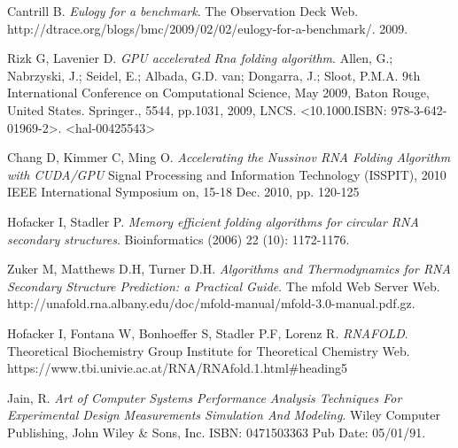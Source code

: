 \documentclass[12pt]{article}
\begin{document}
\begin{thebibliography}{56}
Cantrill B.
\textit{Eulogy for a benchmark}.
The Observation Deck Web. http://dtrace.org/blogs/bmc/2009/02/02/eulogy-for-a-benchmark/.
2009.

Rizk G, Lavenier D.
\textit{GPU accelerated Rna folding algorithm}.
Allen, G.; Nabrzyski, J.; Seidel, E.; Albada, G.D. van; Dongarra, J.; Sloot, P.M.A. 9th International Conference on Computational Science, May 2009, Baton Rouge, United States. Springer., 5544, pp.1031, 2009, LNCS. <10.1000.ISBN: 978-3-642-01969-2>. <hal-00425543>

Chang D, Kimmer C, Ming O.
\textit{Accelerating the Nussinov RNA Folding Algorithm with CUDA/GPU}
Signal Processing and Information Technology (ISSPIT), 2010 IEEE International Symposium on, 15-18 Dec. 2010, pp. 120-125

Hofacker I, Stadler P.
\textit{Memory efficient folding algorithms for circular RNA secondary structures}.
Bioinformatics (2006) 22 (10): 1172-1176.

Zuker M, Matthews D.H, Turner D.H.
\textit{Algorithms and Thermodynamics for RNA
Secondary Structure Prediction:
a Practical Guide}.
The mfold Web Server Web. http://unafold.rna.albany.edu/doc/mfold-manual/mfold-3.0-manual.pdf.gz.

Hofacker I, Fontana W, Bonhoeffer S, Stadler P.F, Lorenz R.
\textit{RNAFOLD}.
Theoretical Biochemistry Group Institute for Theoretical Chemistry Web. https://www.tbi.univie.ac.at/RNA/RNAfold.1.html\#heading5

Jain, R.
\textit{Art of Computer Systems Performance Analysis Techniques For Experimental Design Measurements Simulation And Modeling}.
Wiley Computer Publishing, John Wiley \& Sons, Inc.
ISBN: 0471503363 Pub Date: 05/01/91.

\end{thebibliography}
\end{document}

